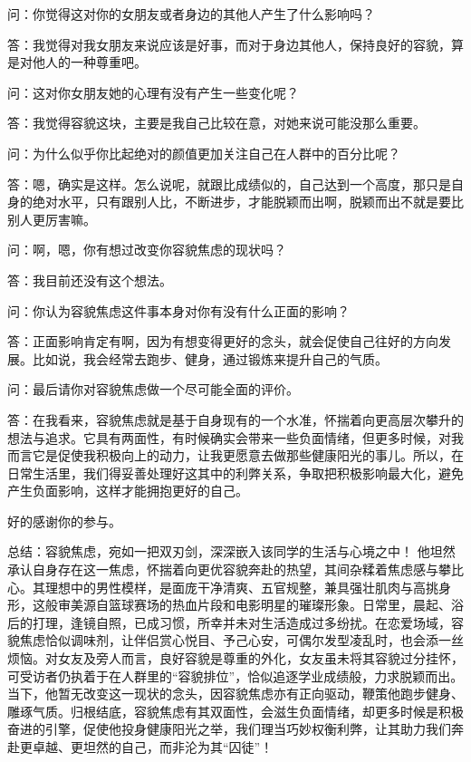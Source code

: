 问：你觉得这对你的女朋友或者身边的其他人产生了什么影响吗？

答：我觉得对我女朋友来说应该是好事，而对于身边其他人，保持良好的容貌，算是对他人的一种尊重吧。

问：这对你女朋友她的心理有没有产生一些变化呢？

答：我觉得容貌这块，主要是我自己比较在意，对她来说可能没那么重要。

问：为什么似乎你比起绝对的颜值更加关注自己在人群中的百分比呢？

答：嗯，确实是这样。怎么说呢，就跟比成绩似的，自己达到一个高度，那只是自身的绝对水平，只有跟别人比，不断进步，才能脱颖而出啊，脱颖而出不就是要比别人更厉害嘛。

问：啊，嗯，你有想过改变你容貌焦虑的现状吗？

答：我目前还没有这个想法。

问：你认为容貌焦虑这件事本身对你有没有什么正面的影响？

答：正面影响肯定有啊，因为有想变得更好的念头，就会促使自己往好的方向发展。比如说，我会经常去跑步、健身，通过锻炼来提升自己的气质。

问：最后请你对容貌焦虑做一个尽可能全面的评价。

答：在我看来，容貌焦虑就是基于自身现有的一个水准，怀揣着向更高层次攀升的想法与追求。它具有两面性，有时候确实会带来一些负面情绪，但更多时候，对我而言它是促使我积极向上的动力，让我更愿意去做那些健康阳光的事儿。所以，在日常生活里，我们得妥善处理好这其中的利弊关系，争取把积极影响最大化，避免产生负面影响，这样才能拥抱更好的自己。

好的感谢你的参与。

总结：容貌焦虑，宛如一把双刃剑，深深嵌入该同学的生活与心境之中！
他坦然承认自身存在这一焦虑，怀揣着向更优容貌奔赴的热望，其间杂糅着焦虑感与攀比心。其理想中的男性模样，是面庞干净清爽、五官规整，兼具强壮肌肉与高挑身形，这般审美源自篮球赛场的热血片段和电影明星的璀璨形象。日常里，晨起、浴后的打理，逢镜自照，已成习惯，所幸并未对生活造成过多纷扰。在恋爱场域，容貌焦虑恰似调味剂，让伴侣赏心悦目、予己心安，可偶尔发型凌乱时，也会添一丝烦恼。对女友及旁人而言，良好容貌是尊重的外化，女友虽未将其容貌过分挂怀，可受访者仍执着于在人群里的``容貌排位''，恰似追逐学业成绩般，力求脱颖而出。当下，他暂无改变这一现状的念头，因容貌焦虑亦有正向驱动，鞭策他跑步健身、雕琢气质。归根结底，容貌焦虑有其双面性，会滋生负面情绪，却更多时候是积极奋进的引擎，促使他投身健康阳光之举，我们理当巧妙权衡利弊，让其助力我们奔赴更卓越、更坦然的自己，而非沦为其``囚徒''！